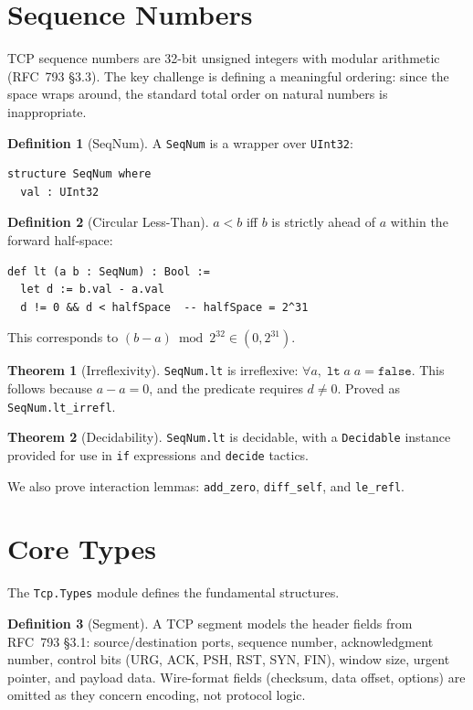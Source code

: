 \documentclass[11pt]{article}
\theoremstyle{definition}
\newtheorem{definition}{Definition}[section]
\newtheorem{theorem}{Theorem}[section]
\begin{document}
\section{Sequence Numbers}
\label{sec:seqnum}

TCP sequence numbers are 32-bit unsigned integers with modular arithmetic
(RFC~793 \S3.3). The key challenge is defining a meaningful ordering: since
the space wraps around, the standard total order on natural numbers is
inappropriate.

\begin{definition}[SeqNum]
A \texttt{SeqNum} is a wrapper over \texttt{UInt32}:
\begin{lstlisting}
structure SeqNum where
  val : UInt32
\end{lstlisting}
\end{definition}

\begin{definition}[Circular Less-Than]
$a < b$ iff $b$ is strictly ahead of $a$ within the forward half-space:
\begin{lstlisting}
def lt (a b : SeqNum) : Bool :=
  let d := b.val - a.val
  d != 0 && d < halfSpace  -- halfSpace = 2^31
\end{lstlisting}
This corresponds to $(b - a) \bmod 2^{32} \in (0, 2^{31})$.
\end{definition}

\begin{theorem}[Irreflexivity]
\texttt{SeqNum.lt} is irreflexive: $\forall a,\; \texttt{lt}\; a\; a = \texttt{false}$.
This follows because $a - a = 0$, and the predicate requires $d \neq 0$.
Proved as \texttt{SeqNum.lt\_irrefl}.
\end{theorem}

\begin{theorem}[Decidability]
\texttt{SeqNum.lt} is decidable, with a \texttt{Decidable} instance provided
for use in \texttt{if} expressions and \texttt{decide} tactics.
\end{theorem}

We also prove interaction lemmas: \texttt{add\_zero}, \texttt{diff\_self},
and \texttt{le\_refl}.

\section{Core Types}
\label{sec:types}

The \texttt{Tcp.Types} module defines the fundamental structures.

\begin{definition}[Segment]
A TCP segment models the header fields from RFC~793 \S3.1: source/destination
ports, sequence number, acknowledgment number, control bits (URG, ACK, PSH,
RST, SYN, FIN), window size, urgent pointer, and payload data. Wire-format
fields (checksum, data offset, options) are omitted as they concern encoding,
not protocol logic.
\end{definition}
\end{document}
